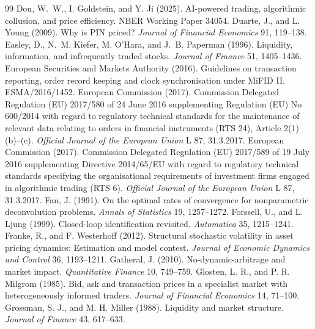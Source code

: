 \documentclass[12pt]{article}
\theoremstyle{definition}
\theoremstyle{remark}
\begin{document}
\begin{thebibliography}{99}
 Dou, W.~W., I. Goldstein, and Y. Ji (2025). AI-powered trading, algorithmic collusion, and price efficiency. NBER Working Paper 34054.
 Duarte, J., and L. Young (2009). Why is PIN priced? \emph{Journal of Financial Economics} 91, 119--138.
 Easley, D., N.~M. Kiefer, M. O'Hara, and J.~B. Paperman (1996). Liquidity, information, and infrequently traded stocks. \emph{Journal of Finance} 51, 1405--1436.
 European Securities and Markets Authority (2016). Guidelines on transaction reporting, order record keeping and clock synchronisation under MiFID II. ESMA/2016/1452.
 European Commission (2017). Commission Delegated Regulation (EU) 2017/580 of 24 June 2016 supplementing Regulation (EU) No 600/2014 with regard to regulatory technical standards for the maintenance of relevant data relating to orders in financial instruments (RTS 24), Article 2(1)(b)--(c). \emph{Official Journal of the European Union} L 87, 31.3.2017.
 European Commission (2017). Commission Delegated Regulation (EU) 2017/589 of 19 July 2016 supplementing Directive 2014/65/EU with regard to regulatory technical standards specifying the organisational requirements of investment firms engaged in algorithmic trading (RTS 6). \emph{Official Journal of the European Union} L 87, 31.3.2017.
 Fan, J. (1991). On the optimal rates of convergence for nonparametric deconvolution problems. \emph{Annals of Statistics} 19, 1257--1272.
 Forssell, U., and L. Ljung (1999). Closed-loop identification revisited. \emph{Automatica} 35, 1215--1241.
 Franke, R., and F. Westerhoff (2012). Structural stochastic volatility in asset pricing dynamics: Estimation and model contest. \emph{Journal of Economic Dynamics and Control} 36, 1193--1211.
 Gatheral, J. (2010). No-dynamic-arbitrage and market impact. \emph{Quantitative Finance} 10, 749--759.
 Glosten, L. R., and P. R. Milgrom (1985). Bid, ask and transaction prices in a specialist market with heterogeneously informed traders. \emph{Journal of Financial Economics} 14, 71--100.
 Grossman, S. J., and M. H. Miller (1988). Liquidity and market structure. \emph{Journal of Finance} 43, 617--633.


\end{thebibliography}
\end{document}
